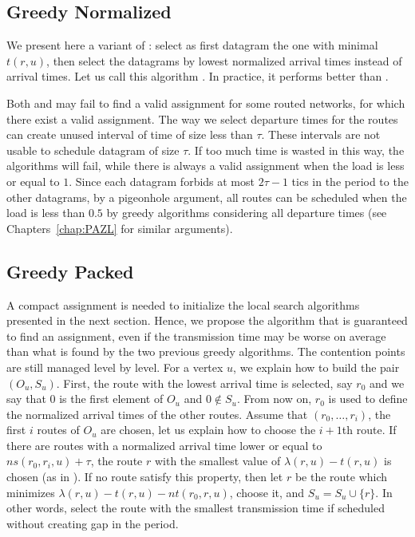 \subsection{Greedy Normalized}

We present here a variant of \greedydeadline: select as first datagram the one with minimal $t(r,u)$, then select the datagrams by lowest normalized arrival times instead of arrival times. Let us call this algorithm
\greedynormalized. In practice, it performs better than \greedydeadline.

Both \greedydeadline and \greedynormalized may fail to find a valid assignment for some routed networks, for which there exist a valid assignment. The way we select departure times for the routes can create unused interval of time of size less than $\tau$. These intervals are not usable to schedule datagram of size $\tau$. If too much time is wasted in this way, the algorithms will fail, while there is always a valid assignment when the load is less or equal to $1$. Since each datagram forbids at most $2\tau -1$ tics in the period to the other datagrams, by a pigeonhole argument, all routes can be scheduled when the load is less than $0.5$ by greedy algorithms considering all departure times (see Chapters~\ref{chap:PAZL} for similar arguments).



\subsection{Greedy Packed}


A compact assignment is needed to initialize the local search algorithms presented in the next section. Hence, we propose the \greedypacked algorithm that is guaranteed to find an assignment, even if the transmission time may be worse on average than what is found by the two previous greedy algorithms.
The contention points are still managed level by level. For a vertex $u$, we explain how to build the pair $(O_u,S_u)$. First, the route with the lowest arrival time is selected, say $r_0$ and we say that $0$ is the first element of $O_u$ and $0 \notin S_u$. From now on, $r_0$ is used to define the normalized arrival times of the other routes. Assume that $(r_0,\dots,r_i)$, the first $i$ routes of $O_u$ are chosen, let us explain how to choose the $i+1$th route. If there are routes with a normalized arrival time lower or equal to $ns(r_0,r_i,u)+\tau$, the route $r$ with the smallest value of $\lambda(r,u) - t(r,u)$ is chosen (as in \greedynormalized). If no route satisfy this property, then let $r$ be the route which minimizes $\lambda(r,u) - t(r,u) - nt(r_0,r,u)$, choose it, and $S_u = S_u \cup \{r\}$. In other words, select the route with the smallest transmission time if scheduled without creating gap in the period.


